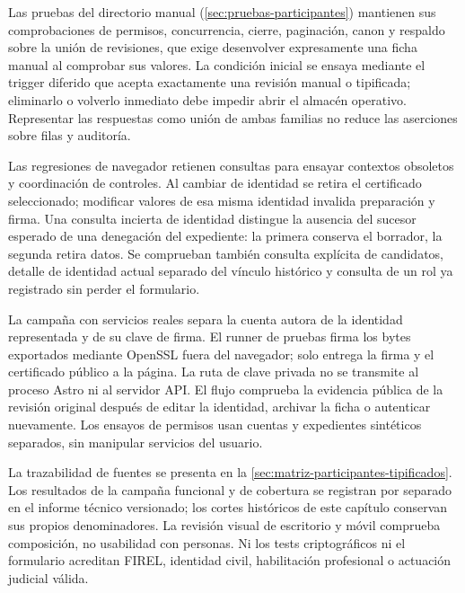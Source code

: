 Las pruebas del directorio manual (\cref{sec:pruebas-participantes}) mantienen sus comprobaciones de permisos, concurrencia, cierre, paginación, canon y respaldo sobre la unión de revisiones, que exige desenvolver expresamente una ficha manual al comprobar sus valores. La condición inicial se ensaya mediante el trigger diferido que acepta exactamente una revisión manual o tipificada; eliminarlo o volverlo inmediato debe impedir abrir el almacén operativo. Representar las respuestas como unión de ambas familias no reduce las aserciones sobre filas y auditoría.

Las regresiones de navegador retienen consultas para ensayar contextos obsoletos y coordinación de controles. Al cambiar de identidad se retira el certificado seleccionado; modificar valores de esa misma identidad invalida preparación y firma. Una consulta incierta de identidad distingue la ausencia del sucesor esperado de una denegación del expediente: la primera conserva el borrador, la segunda retira datos. Se comprueban también consulta explícita de candidatos, detalle de identidad actual separado del vínculo histórico y consulta de un rol ya registrado sin perder el formulario.

La campaña con servicios reales separa la cuenta autora de la identidad representada y de su clave de firma. El runner de pruebas firma los bytes exportados mediante OpenSSL fuera del navegador; solo entrega la firma y el certificado público a la página. La ruta de clave privada no se transmite al proceso Astro ni al servidor API. El flujo comprueba la evidencia pública de la revisión original después de editar la identidad, archivar la ficha o autenticar nuevamente. Los ensayos de permisos usan cuentas y expedientes sintéticos separados, sin manipular servicios del usuario.

La trazabilidad de fuentes se presenta en la \cref{sec:matriz-participantes-tipificados}. Los resultados de la campaña funcional y de cobertura se registran por separado en el informe técnico versionado; los cortes históricos de este capítulo conservan sus propios denominadores. La revisión visual de escritorio y móvil comprueba composición, no usabilidad con personas. Ni los tests criptográficos ni el formulario acreditan FIREL, identidad civil, habilitación profesional o actuación judicial válida.
